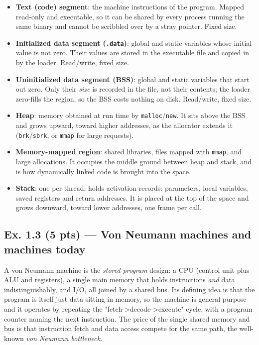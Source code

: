 \begin{itemize}[nosep,leftmargin=1.4em,label=$\bullet$]
  \item \textbf{Text (code) segment}: the machine instructions of the program. Mapped
        read-only and executable, so it can be shared by every process running the same
        binary and cannot be scribbled over by a stray pointer. Fixed size.
  \item \textbf{Initialized data segment (\texttt{.data})}: global and static variables
        whose initial value is not zero. Their values are stored in the executable file
        and copied in by the loader. Read/write, fixed size.
  \item \textbf{Uninitialized data segment (BSS)}: global and static variables that
        start out zero. Only their \emph{size} is recorded in the file, not their
        contents; the loader zero-fills the region, so the BSS costs nothing on disk.
        Read/write, fixed size.
  \item \textbf{Heap}: memory obtained at run time by \texttt{malloc}/\texttt{new}.
        It sits above the BSS and grows upward, toward higher addresses, as the
        allocator extends it (\texttt{brk}/\texttt{sbrk}, or \texttt{mmap} for large
        requests).
  \item \textbf{Memory-mapped region}: shared libraries, files mapped with
        \texttt{mmap}, and large allocations. It occupies the middle ground between heap
        and stack, and is how dynamically linked code is brought into the space.
  \item \textbf{Stack}: one per thread; holds activation records: parameters, local
        variables, saved registers and return addresses. It is placed at the top of the
        space and grows downward, toward lower addresses, one frame per call.
\end{itemize}

\subsection*{Ex. 1.3 (5 pts) --- Von Neumann machines and machines today}
\label{p1:sec:vonneumann}

A von Neumann machine is the \emph{stored-program} design: a CPU (control unit plus ALU
and registers), a single main memory that holds instructions \emph{and} data
indistinguishably, and I/O, all joined by a shared bus. Its defining idea is that the
program is itself just data sitting in memory, so the machine is general purpose and it operates by
repeating the "fetch->decode->execute" cycle, with a program counter naming the next
instruction. The price of the single shared memory and bus is that instruction fetch and
data access compete for the same path, the well-known \emph{von Neumann bottleneck}.

